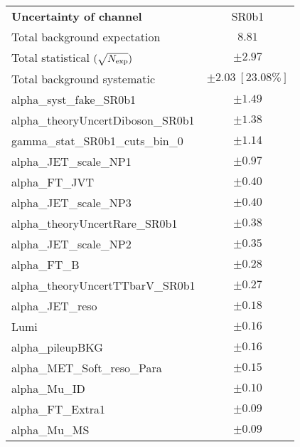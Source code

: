 
\begin{table}
\begin{center}
\setlength{\tabcolsep}{0.0pc}
\begin{tabular*}{\textwidth}{@{\extracolsep{\fill}}lc}
\noalign{\smallskip}\hline\noalign{\smallskip}
{\bf Uncertainty of channel}                                    & SR0b1            \\
\noalign{\smallskip}\hline\noalign{\smallskip}
Total background expectation             &  $8.81$       \\
\noalign{\smallskip}\hline\noalign{\smallskip}
Total statistical $(\sqrt{N_{\rm exp}})$              & $\pm 2.97$       \\
Total background systematic               & $\pm 2.03\ [23.08\%] $             \\
\noalign{\smallskip}\hline\noalign{\smallskip}
\noalign{\smallskip}\hline\noalign{\smallskip}
alpha\_syst\_fake\_SR0b1         & $\pm 1.49$       \\
alpha\_theoryUncertDiboson\_SR0b1         & $\pm 1.38$       \\
gamma\_stat\_SR0b1\_cuts\_bin\_0         & $\pm 1.14$       \\
alpha\_JET\_scale\_NP1         & $\pm 0.97$       \\
alpha\_FT\_JVT         & $\pm 0.40$       \\
alpha\_JET\_scale\_NP3         & $\pm 0.40$       \\
alpha\_theoryUncertRare\_SR0b1         & $\pm 0.38$       \\
alpha\_JET\_scale\_NP2         & $\pm 0.35$       \\
alpha\_FT\_B         & $\pm 0.28$       \\
alpha\_theoryUncertTTbarV\_SR0b1         & $\pm 0.27$       \\
alpha\_JET\_reso         & $\pm 0.18$       \\
Lumi         & $\pm 0.16$       \\
alpha\_pileupBKG         & $\pm 0.16$       \\
alpha\_MET\_Soft\_reso\_Para         & $\pm 0.15$       \\
alpha\_Mu\_ID         & $\pm 0.10$       \\
alpha\_FT\_Extra1         & $\pm 0.09$       \\
alpha\_Mu\_MS         & $\pm 0.09$       \\

\end{tabular*}
\end{center}
\end{table}
